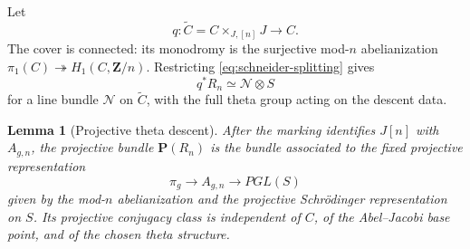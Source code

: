 \documentclass[11pt,reqno]{amsart}
\numberwithin{equation}{section}
\newtheorem{lemma}[lemma]{Lemma}
\theoremstyle{remark}
\newcommand{\bZ}{\mathbf Z}
\newcommand{\bP}{\mathbf P}
\begin{document}
Let
\[
 q\colon\widetilde C=C\times_{J,[n]}J\longrightarrow C.
\tag{3.4}\label{eq:kummer-cover}
\]
The cover is connected: its monodromy is the surjective mod-\(n\)
abelianization
\(\pi_1(C)\twoheadrightarrow H_1(C,\bZ/n)\).  Restricting
\eqref{eq:schneider-splitting} gives
\[
 q^*R_n\simeq\mathcal N\otimes S
\tag{3.5}\label{eq:raynaud-pullback}
\]
for a line bundle \(\mathcal N\) on \(\widetilde C\), with the full theta
group acting on the descent data.

\begin{lemma}[Projective theta descent]\label{lem:projective-theta}
After the marking identifies
\(J[n]\) with \(A_{g,n}\), the projective bundle \(\bP(R_n)\) is the
bundle associated to the fixed projective representation
\[
 \pi_g\longrightarrow A_{g,n}
 \longrightarrow PGL(S)
\tag{3.6}\label{eq:fixed-projective}
\]
given by the mod-\(n\) abelianization and the projective
Schr\"odinger representation on \(S\).  Its projective conjugacy class
is independent of \(C\), of
the Abel--Jacobi base point, and of the chosen theta structure.
\end{lemma}
\end{document}
